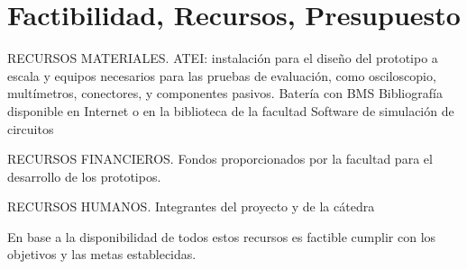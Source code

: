 \section{Factibilidad, Recursos, Presupuesto}
RECURSOS MATERIALES.
ATEI: instalación para el diseño del prototipo a escala y equipos necesarios para las pruebas de evaluación, como osciloscopio, multímetros, conectores, y componentes pasivos. 
Batería con BMS 
Bibliografía disponible en Internet o en la biblioteca de la facultad
Software de simulación de circuitos

RECURSOS FINANCIEROS.
Fondos proporcionados por la facultad para el desarrollo de los prototipos.

RECURSOS HUMANOS.
Integrantes del proyecto y de la cátedra

En base a la disponibilidad de todos estos recursos es factible cumplir con los objetivos y las metas establecidas. 